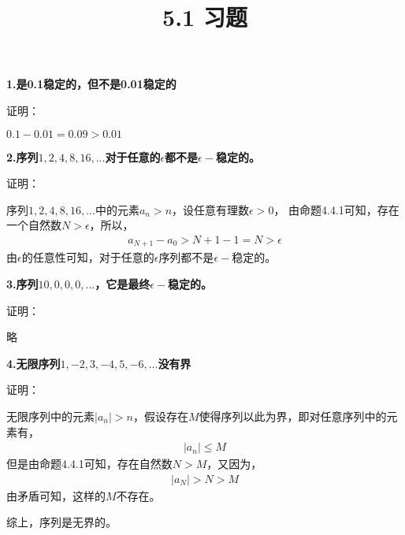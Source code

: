 \documentclass{article}
\theoremstyle{mystyle}
\begin{document}
\title{5.1 习题}
\maketitle


\textbf{1.是0.1稳定的，但不是0.01稳定的} 

证明：

$0.1-0.01=0.09>0.01$

\textbf{2.序列$1,2,4,8,16,...$对于任意的$\epsilon$都不是$\epsilon -$稳定的。}

证明：

序列$1,2,4,8,16,...$中的元素$a_n>n$，设任意有理数$\epsilon > 0$，
由命题4.4.1可知，存在一个自然数$N>\epsilon$，所以，
\begin{align*}
  a_{N+1} - a_0 > N+1 - 1 = N > \epsilon 
\end{align*}
由$\epsilon$的任意性可知，对于任意的$\epsilon$序列都不是$\epsilon -$稳定的。

\textbf{3.序列$10,0,0,0,...$，它是最终$\epsilon -$稳定的。}

证明：

略

\textbf{4.无限序列$1,-2,3,-4,5,-6,...$没有界}

证明：

无限序列中的元素$|a_n| > n$，假设存在$M$使得序列以此为界，即对任意序列中的元素有，
\begin{align*}
  |a_n| \leq M
\end{align*}
但是由命题4.4.1可知，存在自然数$N>M$，又因为，
\begin{align*}
  |a_{N}| > N > M
\end{align*}
由矛盾可知，这样的$M$不存在。

综上，序列是无界的。
\end{document}
